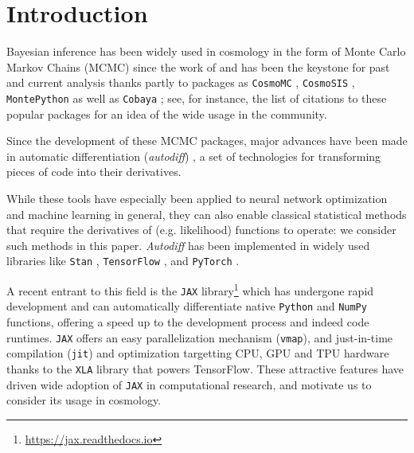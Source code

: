 \documentclass[twocolumn,twocolappendix,nofootinbib,iop]{openjournal}
\begin{document}
\maketitle




\section{Introduction}
Bayesian inference has been widely used in cosmology in the form of Monte Carlo Markov Chains (MCMC) since the work of \citep{2001ApJ...563L..95K,2003MNRAS.341.1084R} and has been the keystone for past and current analysis thanks partly to packages as  \texttt{CosmoMC} \citep{2002PhRvD..66j3511L}, \texttt{CosmoSIS} \citep{2015A&C....12...45Z}, \texttt{MontePython} \citep{2019PDU....24..260B} as well as   \texttt{Cobaya} \citep{2019ascl.soft10019T,2021JCAP...05..057T}; see, for instance, the list of citations to these popular packages for an idea of the wide usage in the community. 


Since the development of these MCMC packages, major advances have been made in automatic differentiation (\textit{autodiff}) \citep{2015arXiv150205767G, 2018arXiv181105031M}, a set of technologies for transforming pieces of code into their derivatives.

While these tools have especially been applied to neural network optimization and machine learning in general, they can also enable classical statistical methods that require the derivatives of (e.g. likelihood) functions to operate: we consider such methods in this paper. \textit{Autodiff} has been implemented in widely used libraries like \texttt{Stan} \citep{JSSv076i01}, \texttt{TensorFlow}  \citep{tensorflow2015-whitepaper}, and  \texttt{PyTorch} \citep{NEURIPS2019_9015}. 

A recent entrant to this field is the \texttt{JAX} library\footnote{\url{https://jax.readthedocs.io}} \citep{jax2018github} which has undergone rapid development and can automatically differentiate native \texttt{Python} and \texttt{NumPy} functions, offering a speed up to the development process and indeed code runtimes. \texttt{JAX} offers an easy parallelization mechanism (\texttt{vmap}), and just-in-time compilation (\texttt{jit}) and optimization targetting CPU, GPU and TPU hardware thanks to the \texttt{XLA} library that powers TensorFlow. These attractive features have driven wide adoption of \texttt{JAX} in computational research, and motivate us to consider its usage in cosmology.
\end{document}

